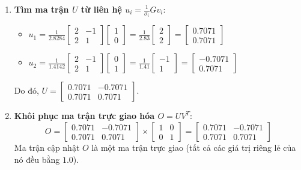 \begin{conceptbox}
\begin{enumerate}[label=\textbf{Bước \arabic*:}, leftmargin=*]
    \item \textbf{Tìm ma trận $U$ từ liên hệ $u_i = \frac{1}{\sigma_i} G v_i$}:
    \begin{itemize}
        \item $u_1 = \frac{1}{2.8284} \begin{bmatrix} 2 & -1 \\ 2 & 1 \end{bmatrix} \begin{bmatrix} 1 \\ 0 \end{bmatrix} = \frac{1}{2.83} \begin{bmatrix} 2 \\ 2 \end{bmatrix} = \begin{bmatrix} 0.7071 \\ 0.7071 \end{bmatrix}$
        \item $u_2 = \frac{1}{1.4142} \begin{bmatrix} 2 & -1 \\ 2 & 1 \end{bmatrix} \begin{bmatrix} 0 \\ 1 \end{bmatrix} = \frac{1}{1.41} \begin{bmatrix} -1 \\ 1 \end{bmatrix} = \begin{bmatrix} -0.7071 \\ 0.7071 \end{bmatrix}$
    \end{itemize}
    Do đó, $U = \begin{bmatrix} 0.7071 & -0.7071 \\ 0.7071 & 0.7071 \end{bmatrix}$.
    
    \item \textbf{Khôi phục ma trận trực giao hóa $O = U V^T$}:
    \[
    O = \begin{bmatrix} 0.7071 & -0.7071 \\ 0.7071 & 0.7071 \end{bmatrix} \times \begin{bmatrix} 1 & 0 \\ 0 & 1 \end{bmatrix} = \begin{bmatrix} 0.7071 & -0.7071 \\ 0.7071 & 0.7071 \end{bmatrix}
    \]
    Ma trận cập nhật $O$ là một ma trận trực giao (tất cả các giá trị riêng lẻ của nó đều bằng $1.0$).
\end{enumerate}
\end{conceptbox}


